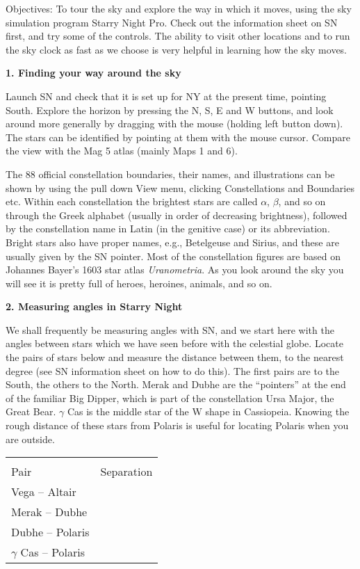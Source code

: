 
\noindent
{Objectives:} To tour the sky and explore the way in which it moves,
using the sky simulation program Starry Night Pro. Check out the
information sheet on SN first, and try some of the controls. The
ability to visit other locations and to run the sky clock as fast as
we choose is very helpful in learning how the sky moves.

\bigskip
\noindent
{\bf 1. Finding your way around the sky}

\medskip
\noindent
Launch SN and check that it is set up for NY at the present time,
pointing South.  Explore the horizon by pressing the N, S, E and W
buttons, and look around more generally by dragging with the mouse
(holding left button down). The stars can be identified by pointing at
them with the mouse cursor. Compare the view with the Mag 5 atlas
(mainly Maps 1 and 6).

The 88 official constellation boundaries, their names, and illustrations
can be shown by using the pull down View menu, clicking Constellations
and Boundaries etc. Within each constellation the brightest stars are
called $\alpha$, $\beta$, and so on through the Greek alphabet
(usually in order of decreasing brightness), followed by the
constellation name in Latin (in the genitive case) or its
abbreviation. Bright stars also have proper names, e.g., Betelgeuse
and Sirius, and these are usually given by the SN pointer. Most of the
constellation figures are based on Johannes Bayer's 1603 star atlas
\emph{Uranometria}. As you look around the sky you will see it is
pretty full of heroes, heroines, animals, and so on.


\bigskip
\noindent
{\bf 2. Measuring angles in Starry Night}

\medskip
\noindent

\noindent
We shall frequently be measuring angles with SN, and we start here
with the angles between stars which we have seen before with the
celestial globe. Locate the pairs of stars below and measure the
distance between them, to the nearest degree (see SN information sheet
on how to do this). The first pairs are to the South, the others to
the North. Merak and Dubhe are the ``pointers'' at the end of the
familiar Big Dipper, which is part of the constellation Ursa
Major, the Great Bear.  $\gamma$ Cas is the middle star of the W shape
in Cassiopeia. Knowing the rough distance of these stars from Polaris
is useful for locating Polaris when you are outside.
 
\begin{center}
\begin{tabular}{lc} \hline \\ [-6pt]
Pair   & \hspace{1cm} Separation \hspace{1cm} \\ [6pt]
\hline
Vega -- Altair         &       \\ \hline
Merak -- Dubhe            &      \\ \hline
Dubhe -- Polaris          &      \\ \hline
$\gamma$ Cas -- Polaris &  \\ \hline
\end{tabular}
\end{center}

